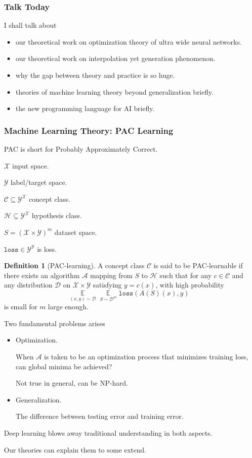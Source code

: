 \documentclass{beamer}   	%
\theoremstyle{definition}
\newtheorem*{defn}{Definition}
\newcommand{\rust}[1]{\texttt{#1}}
\newcommand{\expect}{\mathop{\mathbb{E}}}
\begin{document}
\begin{frame}
\frametitle{Talk Today}
I shall talk about
\begin{itemize}
	\item our theoretical work on optimization theory of ultra wide neural networks.
	\item our theoretical work on interpolation yet generation phenomenon.
	\item why the gap between theory and practice is so huge.
	\item theories of machine learning theory beyond generalization briefly.
	\item the new programming language for AI briefly.
\end{itemize}
\end{frame}

\begin{frame}
\frametitle{Machine Learning Theory: PAC Learning}

PAC is short for Probably Approximately Correct.

$\mathcal{X}$ input space.

$\mathcal{Y}$ label/target space.

$\mathcal{C}\subseteq \mathcal{Y}^\mathcal{X}$ concept class.

$\mathcal{H}\subseteq \mathcal{Y}^\mathcal{X}$ hypothesis class.

$S=(\mathcal{X}\times \mathcal{Y})^m$ dataset space.

$\rust{loss}\in \mathcal{Y}^\mathcal{Y}$ is loss.

\begin{defn}[PAC-learning]
A concept class $\mathcal{C}$ is said to be PAC-learnable if there exists an algorithm $\mathcal{A}$ mapping from $S$ to $\mathcal{H}$ such that for any $c\in \mathcal{C}$ and any distribution $\mathcal{D}$ on $\mathcal{X}\times\mathcal{Y}$ satisfying $y=c(x)$, with high probability
\begin{equation}
	\expect\limits_{(x,y)\sim \mathcal{D}}\expect\limits_{S\sim \mathcal{D}^m}\rust{loss}(A(S)(x),y)
\end{equation}
is small for $m$ large enough.
\end{defn}

\end{frame}

\begin{frame}
	Two fundamental problems arises
	\begin{itemize}
		\item Optimization.

		When $\mathcal{A}$ is taken to be an optimization process that minimizes training loss, can global minima be achieved?

		Not true in general, can be NP-hard.
		\item Generalization.

		The difference between testing error and training error.
	\end{itemize}

	Deep learning blows away traditional understanding in both aspects.

	Our theories can explain them to some extend.
\end{frame}
\end{document}
